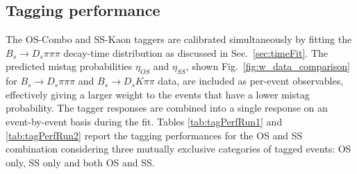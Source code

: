 %
%
%
%

\subsection{Tagging performance}
\label{subsec:TaggingComparison}

The OS-Combo and SS-Kaon taggers are calibrated simultaneously by fitting the $B_s \to D_s \pi\pi\pi$ decay-time distribution as discussed in Sec.~\ref{sec:timeFit}.
The predicted mistag probabilities $\eta_{OS}$ and $\eta_{SS}$, shown Fig.~\ref{fig:w_data_comparison} for $B_s \to D_s \pi\pi\pi$ and $B_s \to D_s K\pi\pi$ data,
are included as per-event observables, effectively giving a larger weight to the events that have a lower mistag probability.
The tagger responses are combined into a single response on an event-by-event basis during the fit.
Tables \ref{tab:tagPerfRun1} and \ref{tab:tagPerfRun2} report the tagging performances for the OS and SS combination 
considering three mutually exclusive categories of tagged events: OS only, SS only and both OS and SS.


